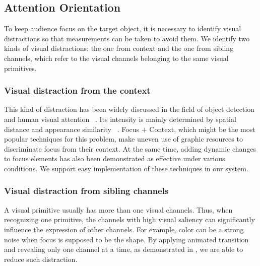 \subsection{Attention Orientation}
To keep audience focus on the target object, it is necessary to identify visual distractions so that measurements can be taken to avoid them. 
We identify two kinds of visual distractions: the one from context and the one from sibling channels, which refer to the visual channels belonging to the same visual primitives. 

\subsubsection{Visual distraction from the context}
This kind of distraction has been widely discussed in the field of object detection and human visual attention ~\cite{nothdurft_salience_2000, standage_modelling_2005}. Its intensity is mainly  determined by spatial distance and appearance similarity ~\cite{wolfe_guided_1994}. 
Focus + Context, which might be the most popular techniques for this problem, make uneven use of graphic resources to discriminate focus from their context. At the same time, adding dynamic changes to focus elements has also been demonstrated as effective under various conditions\cite{waldner_attractive_2014}. We support easy implementation of these techniques in our system. 

\subsubsection{Visual distraction from sibling channels}
A visual primitive usually has more than one visual channels. Thus, when recognizing one primitive, the channels with high visual saliency can significantly influence the expression of other channels. For example, color can be a strong noise when focus is supposed to be the shape. By applying animated transition and revealing only one channel at a time, as demonstrated in , we are able to reduce such distraction.


